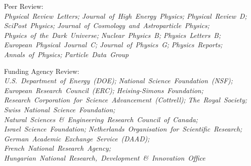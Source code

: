 \item \raggedright Peer Review: \\ \textit{\nohyphens{Physical~Review~Letters; Journal~of~High~Energy~Physics; Physical~Review~D; SciPost~Physics; Journal~of~Cosmology~and~Astroparticle~Physics; Physics~of~the~Dark~Universe; Nuclear~Physics~B; Physics~Letters~B; European~Physical~Journal~C; Journal~of~Physics~G; Physics~Reports; Annals~of~Physics; Particle~Data~Group}}
\item \raggedright Funding Agency Review: \\ \textit{\nohyphens{U.S.~Department~of~Energy~(DOE); National~Science~Foundation~(NSF); European~Research~Council~(ERC); Heising-Simons~Foundation; Research~Corporation~for~Science~Advancement~(Cottrell); The~Royal~Society; Swiss~National~Science~Foundation; Natural~Sciences~\&~Engineering~Research~Council~of~Canada; Israel~Science~Foundation; Netherlands~Organisation~for~Scientific~Research; German~Academic~Exchange~Service~(DAAD); French~National~Research~Agency; Hungarian~National~Research,~Development~\&~Innovation~Office}}
